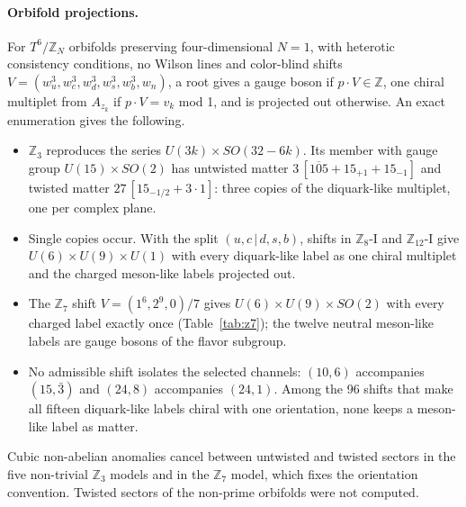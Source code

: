 \paragraph{Orbifold projections.}
For $T^6/\mathbb Z_N$ orbifolds preserving four-dimensional $N=1$, with
heterotic consistency conditions, no Wilson lines and color-blind shifts
$V=(w_u^3,w_c^3,w_d^3,w_s^3,w_b^3,w_n)$, a root gives a gauge boson if
$p\cdot V\in\mathbb Z$, one chiral multiplet from $A_{z_k}$ if
$p\cdot V=v_k$ mod 1, and is projected out otherwise. An exact
enumeration gives the following.
\begin{itemize}
\item $\mathbb Z_3$ reproduces the series $U(3k)\times SO(32-6k)$.
Its member with gauge group $U(15)\times SO(2)$ has untwisted matter
$3\,[\overline{105}+15_{+1}+15_{-1}]$ and twisted matter
$27\,[15_{-1/2}+3\cdot1]$: three copies of the diquark-like multiplet,
one per complex plane.
\item Single copies occur. With the split $(u,c\,|\,d,s,b)$, shifts in
$\mathbb Z_8$-I and $\mathbb Z_{12}$-I give $U(6)\times U(9)\times U(1)$
with every diquark-like label as one chiral multiplet and the charged
meson-like labels projected out.
\item The $\mathbb Z_7$ shift $V=(1^6,2^9,0)/7$ gives
$U(6)\times U(9)\times SO(2)$ with every charged label exactly once
(Table~\ref{tab:z7}); the twelve neutral meson-like labels are gauge
bosons of the flavor subgroup.
\item No admissible shift isolates the selected channels: $(10,6)$
accompanies $(15,\bar3)$ and $(24,8)$ accompanies $(24,1)$. Among the
96 shifts that make all fifteen diquark-like labels chiral with one
orientation, none keeps a meson-like label as matter.
\end{itemize}
Cubic non-abelian anomalies cancel between untwisted and twisted sectors
in the five non-trivial $\mathbb Z_3$ models and in the $\mathbb Z_7$
model, which fixes the orientation convention. Twisted sectors of the
non-prime orbifolds were not computed.


